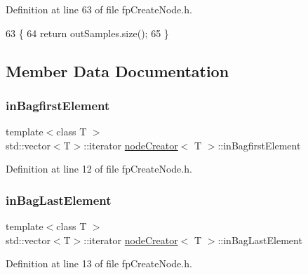 Definition at line 63 of file fp\+Create\+Node.\+h.


\begin{DoxyCode}
63                                  \{
64             \textcolor{keywordflow}{return} outSamples.size();
65         \}
\end{DoxyCode}


\subsection{Member Data Documentation}
\mbox{\label{classnodeCreator_a4ed8c038ff57c273b8b33a670d21214c}} 
\subsubsection{\texorpdfstring{in\+Bagfirst\+Element}{inBagfirstElement}}
{\footnotesize\ttfamily template$<$class T $>$ \\
std\+::vector$<$T$>$\+::iterator \hyperlink{classnodeCreator}{node\+Creator}$<$ T $>$\+::in\+Bagfirst\+Element\hspace{0.3cm}{\ttfamily [private]}}



Definition at line 12 of file fp\+Create\+Node.\+h.

\mbox{\label{classnodeCreator_aaa5de4d5498d0c35696736240efb410f}} 
\subsubsection{\texorpdfstring{in\+Bag\+Last\+Element}{inBagLastElement}}
{\footnotesize\ttfamily template$<$class T $>$ \\
std\+::vector$<$T$>$\+::iterator \hyperlink{classnodeCreator}{node\+Creator}$<$ T $>$\+::in\+Bag\+Last\+Element\hspace{0.3cm}{\ttfamily [private]}}



Definition at line 13 of file fp\+Create\+Node.\+h.

\mbox{\label{classnodeCreator_ac5903268052b2d871be3d426054eca05}} 
